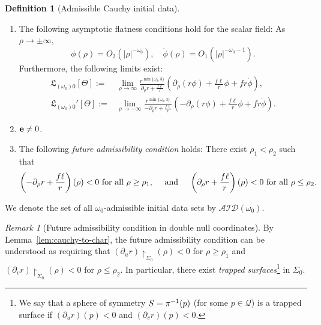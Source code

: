 \documentclass[10pt, reqno]{amsart}
\theoremstyle{definition}
\newtheorem{definition}[theorem]{Definition}
\theoremstyle{remark}
\newtheorem{remark}[theorem]{Remark}
\numberwithin{equation}{section}
\newcommand{\abs}[1]{\vert#1\vert}
\newcommand{\set}[1]{\{#1\}}
\newcommand{\rd}{\partial}
\newcommand{\0}{\emptyset}
\newcommand{\Tht}{\Theta}
\newcommand{\omg}{\omega}
\newcommand{\bfe}{{\bf e}}
\newcommand{\calA}{\mathcal A}
\newcommand{\calD}{\mathcal D}
\newcommand{\calI}{\mathcal I}
\newcommand{\e}{\bfe}							%
\begin{document}
\begin{definition} [Admissible Cauchy initial data]
\begin{enumerate}
\item 
The following asymptotic flatness conditions hold for the scalar field: As $\rho \to \pm \infty$,
\begin{equation} \label{eq:adm-id-phi}
	\phi (\rho) = O_{2}(\abs{\rho}^{-\omg_{0}}), \quad 
	\dot{\phi}(\rho) = O_{1}(\abs{\rho}^{-\omg_{0}-1}). 
\end{equation}
Furthermore, the following limits exist:
\begin{equation} \label{eq:adm-id-limits}
\begin{aligned}
	\mathfrak{L}_{(\omg_{0}) 0}[\Tht] := & \lim_{\rho \to \infty} \frac{r^{\min\set{\omg_{0}, 3}}}{\rd_{\rho} r + \frac{f\ell}{r}} \left(\rd_{\rho} (r \phi) + \frac{f \ell}{r} \phi + f r \dot{\phi} \right), \\ 
	\mathfrak{L}_{(\omg_{0}) 0}'[\Tht] := & \lim_{\rho \to - \infty} \frac{r^{\min\set{\omg_{0}, 3}}}{-\rd_{\rho} r + \frac{f\ell}{r}} \left(-\rd_{\rho} (r \phi) + \frac{f \ell}{r} \phi + f r \dot{\phi} \right).
\end{aligned}
\end{equation}
\item $\e\neq 0$.

\item The following \emph{future admissibility condition} holds: There exist $\rho_1< \rho_2$ such that 
\begin{equation} \label{eq:adm-id-adm}
	\left(- \rd_{\rho} r + \frac{f \ell}{r}  \right) (\rho) < 0 \hbox{ for all } \rho \geq \rho_{1}, \quad \hbox{ and } \quad
	\left(\rd_{\rho} r + \frac{f \ell}{r}\right) (\rho) < 0 \hbox{ for all } \rho \leq \rho_{2}.
\end{equation}
\end{enumerate}
We denote the set of all $\omg_{0}$-admissible initial data sets by $\calA \calI \calD(\omg_{0})$.
\end{definition}

\begin{remark}[Future admissibility condition in double null coordinates]\label{rmk:adm}
By Lemma~\ref{lem:cauchy-to-char}, the future admissibility condition can be understood as requiring that $(\rd_u r)\restriction_{\Sigma_0}(\rho)<0$ for $\rho\geq \rho_{1}$ and $(\rd_v r)\restriction_{\Sigma_0}(\rho)<0$ for $\rho\leq \rho_{2}$. In particular, there exist \emph{trapped surfaces}\footnote{We say that a sphere of symmetry $S={\bf \pi}^{-1}(p)$ (for some $p\in \mathcal Q$) is a trapped surface if $(\rd_u r)(p)<0$ and $(\rd_v r)(p)<0$.} in $\Sigma_0$.
\end{remark}
\end{document}
